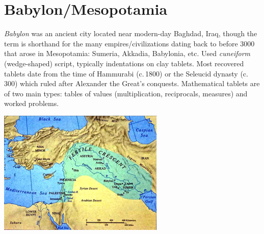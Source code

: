 \graphicspath{{2babylon/pics/}}

\section{Babylon/Mesopotamia}

\begin{minipage}[t]{0.53\linewidth}\vspace{0pt}
\emph{Babylon} was an ancient city located near modern-day Baghdad, Iraq, though the term is shorthand for the many empires/civilizations dating back to before 3000\BC{} that arose in Mesopotamia\footnotemark{}: Sumeria, Akkadia, Babylonia, etc.\smallbreak
Used \emph{cuneiform} (wedge-shaped) script, typically indentations on clay tablets.\smallbreak
Most recovered tablets date from the time of Hammurabi (c.\,1800\BC) or the Seleucid dynasty (c.\,300\BC) which ruled after Alexander the Great's conquests.\smallbreak
Mathematical tablets are of two main types: tables of values (multiplication, reciprocals, measures) and worked problems.
\end{minipage}\hfill\begin{minipage}[t]{0.46\linewidth}\vspace{0pt}
\flushright\includegraphics[scale=0.7]{sumermap}
\end{minipage}



